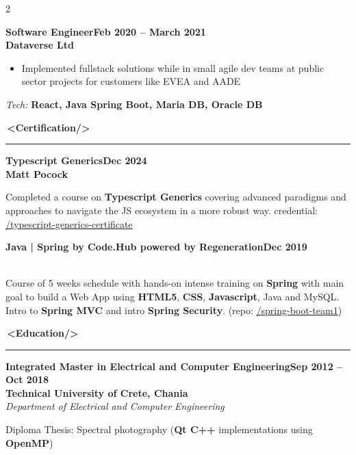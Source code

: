 \documentclass[10pt,a4paper]{article}
\newcommand{\faCertificate}{}%
\newcommand{\faGraduationCap}{}%
\newcommand{\xmlsection}[2][]{%
    \par\vspace{6pt}%
    {\Large\bfseries\color{accent}#1\,\textless#2/\textgreater}%
    \par\vspace{2pt}%
    {\color{accent}\rule{\linewidth}{0.6pt}}\par\vspace{4pt}%
}
\newcommand{\jobentry}[4]{%
    \par\vspace{4pt}%
    \noindent\textbf{#1}\hfill\textbf{#2}\\%
    \textbf{#3}\\%
    \textit{#4}\par\vspace{2pt}%
}
\newenvironment{cvitems}{%
    \begin{itemize}[leftmargin=1.1em,topsep=2pt,itemsep=1pt,parsep=0pt]%
}{%
    \end{itemize}%
}
\newcommand{\techstack}[1]{%
    \vspace{2pt}\noindent\textit{Tech:} \textbf{#1}\par%
}
\begin{document}
\begin{paracol}{2}
\jobentry{Software Engineer}{Feb 2020 -- March 2021}{Dataverse Ltd}{}
\begin{cvitems}
    \item Implemented fullstack solutions while in small agile dev teams at public sector projects for customers like EVEA and AADE
\end{cvitems}
\techstack{React, Java Spring Boot, Maria DB, Oracle DB}

\xmlsection[\faCertificate]{Certification}

\jobentry{Typescript Generics}{Dec 2024}{Matt Pocock}{}
Completed a course on \textbf{Typescript Generics} covering advanced paradigms
and approaches to navigate the JS ecosystem in a more robust way.
credential: \href{https://res.cloudinary.com/total-typescript/image/upload/v1734378527/certificate/fbf94fc5-9891-4584-93eb-387b76f13171/typescript-generics.png}{/typescript-generics-certificate}

\jobentry{Java | Spring by Code.Hub powered by Regeneration}{Dec 2019}{}{}
Course of 5 weeks schedule with hands-on intense training on \textbf{Spring} with main goal
to build a Web App using \textbf{HTML5}, \textbf{CSS}, \textbf{Javascript}, Java and MySQL.
Intro to \textbf{Spring MVC} and intro \textbf{Spring Security}.
(repo: \href{https://github.com/geogeorgiou/spring-boot-team1}{/spring-boot-team1})

\xmlsection[\faGraduationCap]{Education}

\jobentry{Integrated Master in Electrical and Computer Engineering}{Sep 2012 -- Oct 2018}{Technical University of Crete, Chania}{Department of Electrical and Computer Engineering}

Diploma Thesis: Spectral photography (\textbf{Qt C++} implementations using \textbf{OpenMP})

\end{paracol}
\end{document}

